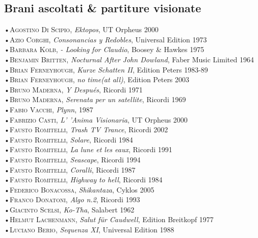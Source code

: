 \documentclass[oneside]{article}
\begin{document}
\begin{multicols*}{2}
\section{ Brani ascoltati \& partiture visionate}
•\textsc{\textsf {Agostino Di Scipio}}, \emph{Ektopos}, UT Orpheus 2000\\
•\textsc{\textsf {Azio Corghi}}, \emph{Consonancias y Redobles}, Universal Edition 1973\\
•\textsc{\textsf {Barbara Kolb}}, \emph{ - Looking for Claudio}, Boosey \& Hawkes 1975\\
•\textsc{\textsf {Benjamin Britten}}, \emph{Nocturnal After John Dowland}, Faber Music Limited 1964\\
•\textsc{\textsf {Brian Ferneyhough}}, \emph{Kurze Schatten II}, Edition Peters 1983-89\\
•\textsc{\textsf {Brian Ferneyhough}}, \emph{no time(at all)}, Edition Peters 2003\\
•\textsc{\textsf {Bruno Maderna}}, \emph{Y Después}, Ricordi 1971\\
•\textsc{\textsf {Bruno Maderna}}, \emph{Serenata per un satellite}, Ricordi 1969\\
•\textsc{\textsf {Fabio Vacchi}}, \emph{Plynn}, 1987\\
•\textsc{\textsf {Fabrizio Casti}}, \emph{ L' 'Anima Visionaria}, UT Orpheus 2000\\
•\textsc{\textsf {Fausto Romitelli}}, \emph{Trash TV Trance}, Ricordi 2002\\
•\textsc{\textsf {Fausto Romitelli}}, \emph{Solare}, Ricordi 1984\\
•\textsc{\textsf {Fausto Romitelli}}, \emph{La lune et les eaux}, Ricordi 1991\\
•\textsc{\textsf {Fausto Romitelli}}, \emph{Seascape}, Ricordi 1994\\
•\textsc{\textsf {Fausto Romitelli}}, \emph{Coralli}, Ricordi 1987\\
•\textsc{\textsf {Fausto Romitelli}}, \emph{Highway to hell}, Ricordi 1984\\
•\textsc{\textsf {Federico Bonacossa}}, \emph{Shikantaza}, Cyklos 2005\\
•\textsc{\textsf {Franco Donatoni}}, \emph{Algo n.2}, Ricordi 1993\\
•\textsc{\textsf {Giacinto Scelsi}}, \emph{Ko-Tha}, Salabert 1962\\
•\textsc{\textsf {Helmut Lachenmann}}, \emph{Salut für Caudwell}, Edition Breitkopf 1977\\
•\textsc{\textsf {Luciano Berio}}, \emph{Sequenza XI}, Universal Edition 1988\\

\end{multicols*}
\end{document}
